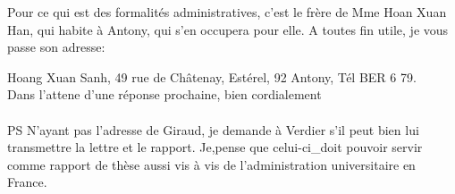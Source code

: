 
Pour ce qui est des formalités administratives, c'est le frère de Mme Hoan Xuan Han, qui habite à Antony, qui s'en occupera pour elle. A toutes fin utile, je vous passe son adresse:

Hoang Xuan Sanh, 49 rue de Châtenay, Estérel, 92 Antony, Tél BER 6 79.\\

Dans l'attene d'une réponse prochaine, bien cordialement\\
\hfill{}\\

PS N'ayant pas l'adresse de Giraud, je demande à Verdier s'il peut bien lui transmettre la lettre et le rapport. Je,pense que celui-ci\_doit pouvoi\rlap{\raisebox{-1.1ex}[0pt][0pt]{\hspace{.2em}\unsure{(}}}r servir comme rapport de thèse aussi vis à vis de l'administration universitaire en France.
